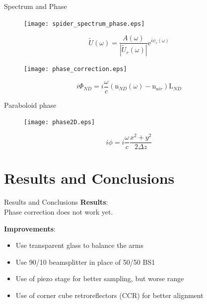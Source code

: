 \documentclass[11pt]{beamer}
\begin{document}
\begin{frame}{Spectrum and Phase}
\vspace{-15pt}
\begin{figure}
	\centering
	\texttt{[image: spider\_spectrum\_phase.eps]}
\end{figure}
\vspace{-5pt}
\begin{equation*}
\tilde{U}(\omega) = \frac{A(\omega)}{|\tilde{U}_r(\omega)|}\mathrm{e}^{i\psi_r(\omega)}
\end{equation*}
\end{frame}

\begin{frame}
\begin{figure}
	\texttt{[image: phase\_correction.eps]}
\end{figure}
\begin{equation}
i\Phi_{ND} = i\frac{\omega}{c}(\mathrm{n}_{ND}(\omega)-\mathrm{n}_{air})\mathrm{L}_{ND}
	\label{eq_ND_phase}
\end{equation}
\end{frame}

\begin{frame}{Paraboloid phase}
\begin{figure}
	\texttt{[image: phase2D.eps]}
\end{figure}
\vspace{-15pt}
\begin{equation}
i\phi = i\frac{\omega}{c}\frac{x^2 + y^2}{2\Delta z}
	\label{eq_paraboloid}
\end{equation}
\end{frame}

\section{Results and Conclusions}
\begin{frame}{Results and Conclusions}
\textbf{Results}:\\
	Phase correction does not work yet.

	\vspace{5pt}
\textbf{Improvements}:\\
	\begin{itemize}
		\item Use transparent glass to balance the arms
		\item Use 90/10 beamsplitter in place of 50/50 BS1
		\item Use of piezo stage for better sampling, but worse range
		\vspace{5pt}
		\item Use of corner cube retroreflectors (CCR) for better alignment
	\end{itemize}
%	
\end{frame}
\end{document}

